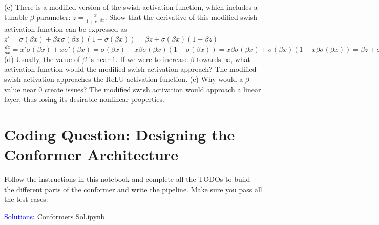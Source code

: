 \documentclass{article}
\begin{document}
\color{black}(c) There is a modified version of the swish activation function, which includes a tunable $\beta$ parameter: $z=\frac{x}{1+e^{-\beta x}}$. Show that the derivative of this modified swish activation function can be expressed as $z'=\sigma (\beta x)+\beta x \sigma (\beta x)(1-\sigma (\beta x)) = \beta z+\sigma(\beta x)(1-
\beta z)$\newline\newline
\color{blue} $\frac{dz}{dx}=x'\sigma(\beta x)+x\sigma'(\beta x)=\sigma(\beta x)+x\beta \sigma(\beta x)(1-\sigma(\beta x))=x\beta \sigma(\beta x)+\sigma(\beta x)(1-x\beta \sigma(\beta x))=\beta z+\sigma(\beta x)(1-
\beta z)$ \newline\newline
\color{black}(d) Usually, the value of $\beta$ is near $1$. If we were to increase $\beta$ towards $\infty$, what activation function would the modified swish activation approach?\newline\newline
\color{blue} The modified swish activation approaches the ReLU activation function.\newline\newline
\color{black}(e) Why would a $\beta$ value near 0 create issues?\newline\newline
\color{blue} The modified swish activation would approach a linear layer, thus losing its desirable nonlinear properties.\newline\newline
\color{black}

\newpage
\thispagestyle{plain}
\section{Coding Question: Designing the Conformer Architecture}
Follow the instructions in this notebook and complete all the TODOs to build the different parts of the conformer and write the pipeline. Make sure you pass all the test cases:
\href{https://colab.research.google.com/drive/1r5xv6N49ooYWbXL95672rZyXyFMNd3jL?usp=sharing}{\color{blue}{Conformers.ipynb}}

\textcolor{blue}{Solutions: \href{https://colab.research.google.com/drive/1Q00-JxOso81a2XvoKG3cda0NRTVlV70g?usp=sharing}{Conformers Sol.ipynb}}

\newpage
\thispagestyle{plain}
\end{document}

